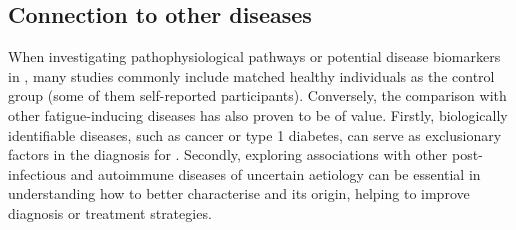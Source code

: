\subsection{Connection to other diseases}
\label{subsec:similatities-other-diseases}

When investigating pathophysiological pathways or potential disease biomarkers in \cfs, many studies commonly include matched healthy individuals as the control group (some of them self-reported participants).
Conversely, the comparison with other fatigue-inducing diseases has also proven to be of value.
Firstly, biologically identifiable diseases, such as cancer or type 1 diabetes, can serve as exclusionary factors in the diagnosis for \cfs \citep{carruthers2003MyalgicEncephalomyelitis}.
Secondly, exploring associations with other post-infectious and autoimmune diseases of uncertain aetiology can be essential in understanding how to better characterise \cfs and its origin, helping to improve diagnosis or treatment strategies.


